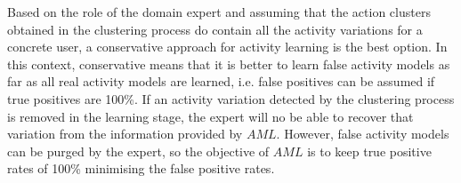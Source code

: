Based on the role of the domain expert and assuming that the action clusters obtained in the clustering process do contain all the activity variations for a concrete user, a conservative approach for activity learning is the best option. In this context, conservative means that it is better to learn false activity models as far as all real activity models are learned, i.e. false positives can be assumed if true positives are 100\%. If an activity variation detected by the clustering process is removed in the learning stage, the expert will no be able to recover that variation from the information provided by $AML$. However, false activity models can be purged by the expert, so the objective of $AML$ is to keep true positive rates of 100\% minimising the false positive rates. 

